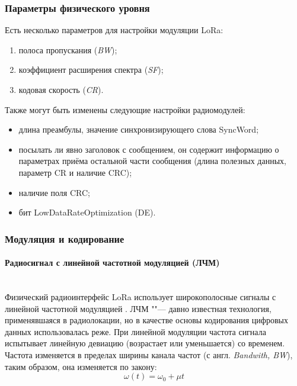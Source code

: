 \subsubsection{Параметры физического уровня} 

Есть несколько параметров для настройки модуляции LoRa: 
\begin{enumerate}
	\item полоса пропускания (\textit{BW}); 
	\item коэффициент расширения спектра (\textit{SF}); 
	\item кодовая скорость (\textit{CR}).
\end{enumerate}

Также могут быть изменены следующие настройки радиомодулей:
\begin{itemize}
	\item длина преамбулы, значение синхронизирующего слова SyncWord;
	\item посылать ли явно заголовок с сообщением, он содержит информацию о параметрах приёма остальной части сообщения (длина полезных данных, параметр CR и наличие CRC);
	\item наличие поля CRC;
	\item бит LowDataRateOptimization (DE).
\end{itemize}

\subsubsection{Модуляция и кодирование}

\paragraph{Радиосигнал с линейной частотной модуляцией (ЛЧМ)} \hspace{0pt}\\

Физический радиоинтерфейс LoRa использует широкополосные сигналы с линейной частотной модуляцией \cite{augustin2016}. 
ЛЧМ ""--- давно известная технология, применявшаяся в радиолокации, но в качестве основы кодирования цифровых данных использовалась реже.
При линейной модуляции частота сигнала испытывает линейную девиацию (возрастает или уменьшается) со временем. 
Частота изменяется в пределах ширины канала частот (с англ. \textit{Bandwith, BW}), таким образом, она изменяется по закону:
\begin{equation}
	\omega(t) = \omega_0 + \mu t
\end{equation}

